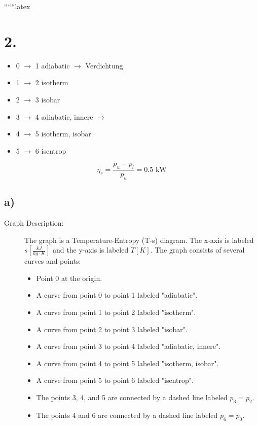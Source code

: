 
``````latex


\section*{2.}

\begin{itemize}
    \item 0 $\rightarrow$ 1 adiabatic $\rightarrow$ Verdichtung
    \item 1 $\rightarrow$ 2 isotherm
    \item 2 $\rightarrow$ 3 isobar
    \item 3 $\rightarrow$ 4 adiabatic, innere $\rightarrow$
    \item 4 $\rightarrow$ 5 isotherm, isobar
    \item 5 $\rightarrow$ 6 isentrop
\end{itemize}

\[
\eta_s = \frac{p_u - p_l}{p_u} = 0.5 \text{ kW}
\]

\subsection*{a)}

\begin{description}
    \item[Graph Description:] The graph is a Temperature-Entropy (T-s) diagram. The x-axis is labeled $s \left[ \frac{kJ}{kg \cdot K} \right]$ and the y-axis is labeled $T \left[ K \right]$. The graph consists of several curves and points:
    \begin{itemize}
        \item Point 0 at the origin.
        \item A curve from point 0 to point 1 labeled "adiabatic".
        \item A curve from point 1 to point 2 labeled "isotherm".
        \item A curve from point 2 to point 3 labeled "isobar".
        \item A curve from point 3 to point 4 labeled "adiabatic, innere".
        \item A curve from point 4 to point 5 labeled "isotherm, isobar".
        \item A curve from point 5 to point 6 labeled "isentrop".
        \item The points 3, 4, and 5 are connected by a dashed line labeled $p_3 = p_2$.
        \item The points 4 and 6 are connected by a dashed line labeled $p_6 = p_0$.
    \end{itemize}
\end{description}

